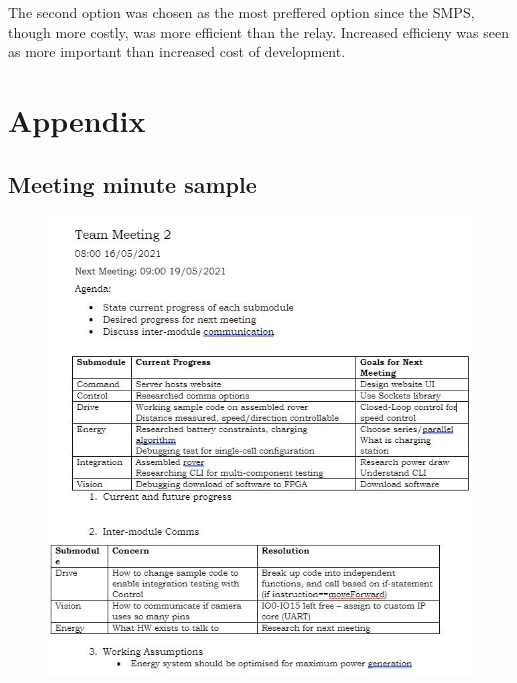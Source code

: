 \documentclass[11pt, a4paper]{article}
\begin{document}
The second option was chosen as the most preffered option since the SMPS, though more costly, was more efficient than the relay. Increased efficieny was seen as more important than increased cost of development.






\pagebreak
\printbibliography[heading=bibnumbered, title={References}]


\pagebreak
\section{Appendix}

\subsection{Meeting minute sample}

\begin{figure} [h!]
    \centering
    \includegraphics[scale=0.8]{Minute_sample.JPG}
\end{figure}
\end{document}
